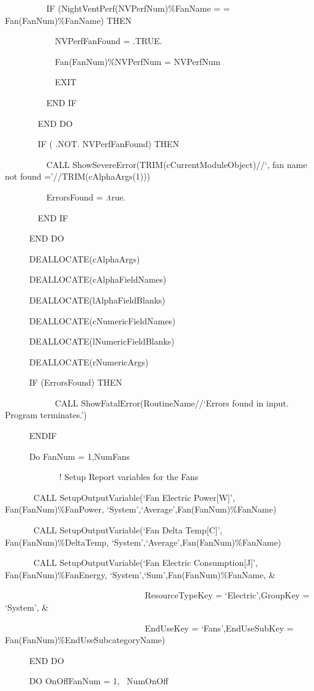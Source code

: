 ~~~~~~~~~ IF (NightVentPerf(NVPerfNum)\%FanName = = Fan(FanNum)\%FanName) THEN

~~~~~~~~~~~ NVPerfFanFound = .TRUE.

~~~~~~~~~~~ Fan(FanNum)\%NVPerfNum = NVPerfNum

~~~~~~~~~~~ EXIT

~~~~~~~~~ END IF

~~~~~~~ END DO

~~~~~~~ IF ( .NOT. NVPerfFanFound) THEN

~~~~~~~~~ CALL ShowSevereError(TRIM(cCurrentModuleObject)//`, fan name not found ='//TRIM(cAlphaArgs(1)))

~~~~~~~~~ ErrorsFound = .true.

~~~~~~~ END IF

~~~~~ END DO

~~~~~ DEALLOCATE(cAlphaArgs)

~~~~~ DEALLOCATE(cAlphaFieldNames)

~~~~~ DEALLOCATE(lAlphaFieldBlanks)

~~~~~ DEALLOCATE(cNumericFieldNames)

~~~~~ DEALLOCATE(lNumericFieldBlanks)

~~~~~ DEALLOCATE(rNumericArgs)

~~~~~ IF (ErrorsFound) THEN

~~~~~~~~~~~ CALL ShowFatalError(RoutineName//`Errors found in input.~ Program terminates.')

~~~~~ ENDIF

~~~~~ Do FanNum = 1,NumFans

~~~~~~~~~~~~ ! Setup Report variables for the Fans

~~~~~~ CALL SetupOutputVariable(`Fan Electric Power{[}W{]}', Fan(FanNum)\%FanPower, `System',`Average',Fan(FanNum)\%FanName)

~~~~~~ CALL SetupOutputVariable(`Fan Delta Temp{[}C{]}', Fan(FanNum)\%DeltaTemp, `System',`Average',Fan(FanNum)\%FanName)

~~~~~~ CALL SetupOutputVariable(`Fan Electric Consumption{[}J{]}', Fan(FanNum)\%FanEnergy, `System',`Sum',Fan(FanNum)\%FanName, \&

~~~~~~~~~~~~~~~~~~~~~~~~~~~~~~~~ ResourceTypeKey = `Electric',GroupKey = `System', \&

~~ ~~~~~~~~~~~~~~~~~~~~~~~~~~~~~~EndUseKey = `Fans',EndUseSubKey = Fan(FanNum)\%EndUseSubcategoryName)

~~~~~ END DO

~~~~~ DO OnOffFanNum = 1,~ NumOnOff

